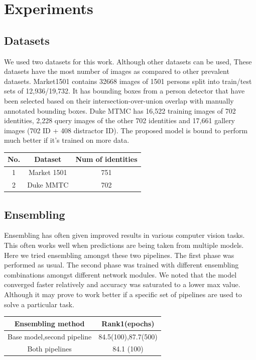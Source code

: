 \documentclass[10pt,twocolumn,letterpaper]{article}
\begin{document}
\section{Experiments}

\subsection{Datasets}

We used two datasets for this work. Although other datasets can be used, These datasets have the most number of images as compared to other prevalent datasets. Market1501 contains 32668 images of 1501 persons split into train/test sets of 12,936/19,732. It has bounding boxes from a person detector that have been selected based on their intersection-over-union overlap with manually annotated bounding boxes. Duke MTMC has 16,522 training images of 702 identities, 2,228 query images of the other 702 identities and 17,661 gallery images (702 ID + 408 distractor ID). The proposed model is bound to perform much better if it's trained on more data.
\begin{center}
 \begin{tabular}{||c c c ||} 
 \hline
 No. & Dataset & Num of identities \\ [0.5ex] 
 \hline\hline
 1 & Market 1501 & 751 \\ 
 \hline
 2 & Duke MMTC & 702 \\  [1ex] 
 \hline
\end{tabular}
\end{center}

\subsection {Ensembling}
Ensembling has often given improved results in various computer vision tasks. This often works well when predictions are being taken from multiple models. Here we tried ensembling amongst these two pipelines. The first phase was performed as usual. The second phase was trained with different ensembling combinations amongst different network modules. We noted that the model converged faster relatively and accuracy was saturated to a lower max value. Although it may prove to work better if a specific set of pipelines are used to solve a particular task.

\begin{table}[h!]
\centering
 \begin{tabular}{||c c||} 
 \hline
 Ensembling method & Rank1(epochs)\\ [0.5ex] 
 \hline
 Base model,second pipeline & 84.5(100),87.7(500)\\ 
 \hline
 Both pipelines & 84.1 (100)\\
 \hline
\end{tabular}
\end{table}
\end{document}
